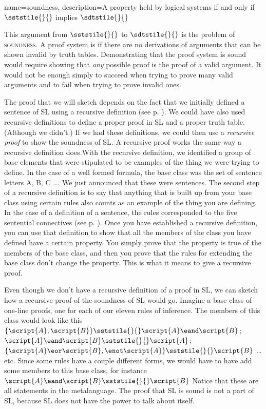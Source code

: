 {
name=soundness,
description={A property held by logical systems if and only if $\sststile{}{}$ implies $\sdtstile{}{}$}
}

This argument from $\sststile{}{}$ to $\sdtstile{}{}$ is the problem of \textsc{\gls{soundness}}. \label{def:soundness} A proof system is  if there are no derivations of arguments that can be shown invalid by truth tables. \label{def_Soundness} Demonstrating that the proof system is sound would require showing that \emph{any} possible proof is the proof of a valid argument. It would not be enough simply to succeed when trying to prove many valid arguments and to fail when trying to prove invalid ones.

The proof that we will sketch depends on the fact that we initially defined a sentence of SL using a recursive definition (see p. \pageref{def:recursive_definition}). We could have also used recursive definitions to define a proper proof in SL and a proper truth table. (Although we didn't.) If we had these definitions, we could then use a \emph{recursive proof} to show the soundness of SL. A recursive proof works the same way a recursive definition does.With the recursive definition, we identified a group of base elements that were stipulated to be examples of the thing we were trying to define. In the case of a well formed formula, the base class was the set of sentence letters A, B, C \ldots{}. We just announced that these were sentences. The second step of a recursive definition is to say that anything that is built up from your base class using certain rules also counts as an example of the thing you are defining. In the case of a definition of a sentence, the rules corresponded to the five sentential connectives (see p. \pageref{def:sentence_of_SL}). Once you have established a recursive definition, you can use that definition to show that all the members of the class you have defined have a certain property. You simply prove that the property is true of the members of the base class, and then you prove that the rules for extending the base class don't change the property. This is what it means to give a recursive proof.

Even though we don't have a recursive definition of a proof in SL, we can sketch how a recursive proof of the soundness of SL would go. Imagine a base class of one-line proofs, one for each of our eleven rules of inference. The members of this class would look like this $\{\script{A}, \script{B}\} \sststile{}{} \script{A} \eand \script{B}$; $\script{A} \eand \script{B} \sststile{}{}\script{A}$; $\{\script{A} \eor \script{B}, \enot\script{A}\} \sststile{}{} \script{B}$ \ldots{} etc. Since some rules have a couple different forms, we would have to have add some members to this base class, for instance $\script{A} \eand \script{B} \sststile{}{} \script{B}$ Notice that these are all statements in the metalanguage. The proof that SL is sound is not a part of SL, because SL does not have the power to talk about itself. 

